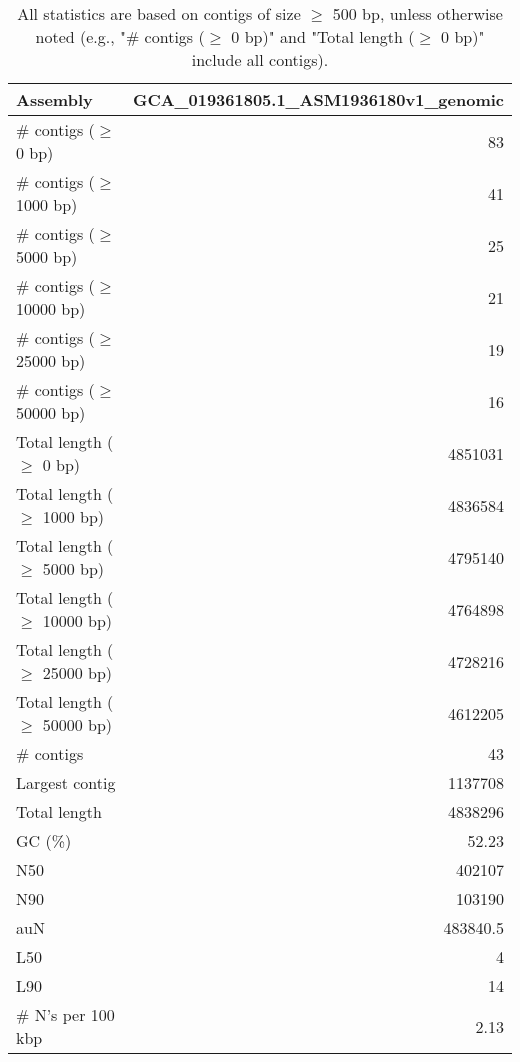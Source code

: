 \documentclass[12pt,a4paper]{article}
\begin{document}
\begin{table}[ht]
\begin{center}
\caption{All statistics are based on contigs of size $\geq$ 500 bp, unless otherwise noted (e.g., "\# contigs ($\geq$ 0 bp)" and "Total length ($\geq$ 0 bp)" include all contigs).}
\begin{tabular}{|l*{1}{|r}|}
\hline
Assembly & GCA\_019361805.1\_ASM1936180v1\_genomic \\ \hline
\# contigs ($\geq$ 0 bp) & 83 \\ \hline
\# contigs ($\geq$ 1000 bp) & 41 \\ \hline
\# contigs ($\geq$ 5000 bp) & 25 \\ \hline
\# contigs ($\geq$ 10000 bp) & 21 \\ \hline
\# contigs ($\geq$ 25000 bp) & 19 \\ \hline
\# contigs ($\geq$ 50000 bp) & 16 \\ \hline
Total length ($\geq$ 0 bp) & 4851031 \\ \hline
Total length ($\geq$ 1000 bp) & 4836584 \\ \hline
Total length ($\geq$ 5000 bp) & 4795140 \\ \hline
Total length ($\geq$ 10000 bp) & 4764898 \\ \hline
Total length ($\geq$ 25000 bp) & 4728216 \\ \hline
Total length ($\geq$ 50000 bp) & 4612205 \\ \hline
\# contigs & 43 \\ \hline
Largest contig & 1137708 \\ \hline
Total length & 4838296 \\ \hline
GC (\%) & 52.23 \\ \hline
N50 & 402107 \\ \hline
N90 & 103190 \\ \hline
auN & 483840.5 \\ \hline
L50 & 4 \\ \hline
L90 & 14 \\ \hline
\# N's per 100 kbp & 2.13 \\ \hline
\end{tabular}
\end{center}
\end{table}
\end{document}
